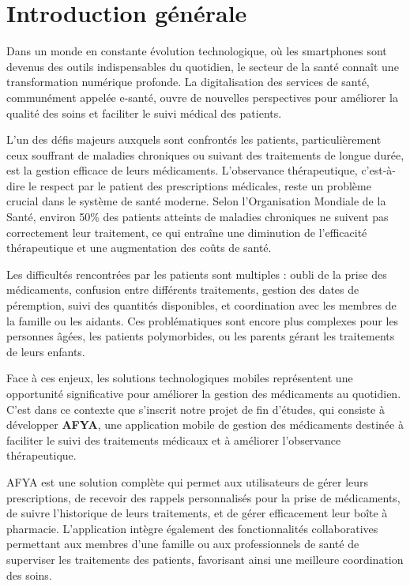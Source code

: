 \chapter*{Introduction générale}

Dans un monde en constante évolution technologique, où les smartphones sont devenus des outils indispensables du quotidien, le secteur de la santé connaît une transformation numérique profonde. La digitalisation des services de santé, communément appelée e-santé, ouvre de nouvelles perspectives pour améliorer la qualité des soins et faciliter le suivi médical des patients.

L'un des défis majeurs auxquels sont confrontés les patients, particulièrement ceux souffrant de maladies chroniques ou suivant des traitements de longue durée, est la gestion efficace de leurs médicaments. L'observance thérapeutique, c'est-à-dire le respect par le patient des prescriptions médicales, reste un problème crucial dans le système de santé moderne. Selon l'Organisation Mondiale de la Santé, environ 50\% des patients atteints de maladies chroniques ne suivent pas correctement leur traitement, ce qui entraîne une diminution de l'efficacité thérapeutique et une augmentation des coûts de santé.

Les difficultés rencontrées par les patients sont multiples : oubli de la prise des médicaments, confusion entre différents traitements, gestion des dates de péremption, suivi des quantités disponibles, et coordination avec les membres de la famille ou les aidants. Ces problématiques sont encore plus complexes pour les personnes âgées, les patients polymorbides, ou les parents gérant les traitements de leurs enfants.

Face à ces enjeux, les solutions technologiques mobiles représentent une opportunité significative pour améliorer la gestion des médicaments au quotidien. C'est dans ce contexte que s'inscrit notre projet de fin d'études, qui consiste à développer \textbf{AFYA}, une application mobile de gestion des médicaments destinée à faciliter le suivi des traitements médicaux et à améliorer l'observance thérapeutique.

AFYA est une solution complète qui permet aux utilisateurs de gérer leurs prescriptions, de recevoir des rappels personnalisés pour la prise de médicaments, de suivre l'historique de leurs traitements, et de gérer efficacement leur boîte à pharmacie. L'application intègre également des fonctionnalités collaboratives permettant aux membres d'une famille ou aux professionnels de santé de superviser les traitements des patients, favorisant ainsi une meilleure coordination des soins.

